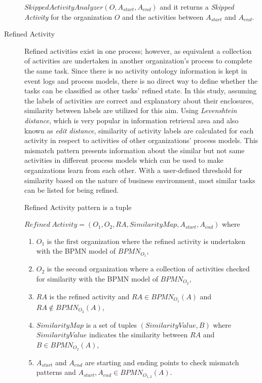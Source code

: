 \begin{description}
\begin{definition}
		$SkippedActivityAnalyzer(O, A_{start}, A_{end})$ and it returns a \textit{Skipped Activity} for the organization $O$ and the activities between $A_{start}$ and $A_{end}$.
		\end{definition}
  \item[Refined Activity] Refined activities exist in one process; however, as equivalent a collection of activities are undertaken in another organization's process to complete the same task. Since there is no activity ontology information is kept in event logs and process models, there is no direct way to define whether the tasks can be classified as other tasks' refined state. In this study, assuming the labels of activities are correct and explanatory about their enclosures, similarity between labels are utilized for this aim. Using \textit{Levenshtein distance}, which is very popular in information retrieval area and also known as \textit{edit distance}, similarity of activity labels are calculated for each activity in respect to activities of other organizations' process models. This mismatch pattern presents information about the similar but not same activities in different process models which can be used to make organizations learn from each other. With a user-defined threshold for similarity based on the nature of business environment, most similar tasks can be listed for being refined.
		\theoremstyle{definition}
		\begin{definition}
		Refined Activity pattern is a tuple 

		${Refined\ Activity} = (O_{1}, O_{2}, RA, SimilarityMap, A_{start}, A_{end}) $ where 
		\begin{enumerate}
		  \item $O_{1}$ is the first organization where the refined activity is undertaken with the BPMN model of $BPMN_{{O}_{1}}$,
		  \item $O_{2}$ is the second organization where a collection of activities checked for similarity with the BPMN model of $BPMN_{{O}_{2}}$,
		  \item $RA$ is the refined activity and $RA \in BPMN_{{O}_{1}}(A)$ and $RA \notin BPMN_{{O}_{2}}(A)$,
		  \item $SimilarityMap$ is a set of tuples $(SimilarityValue, B)$ where $SimilarityValue$ indicates the similarity between $RA$ and $B \in BPMN_{{O}_{2}}(A)$, 
 		  \item $A_{start}$ and $A_{end}$ are starting and ending points to check mismatch patterns and $A_{start}, A_{end} \in BPMN_{{O}_{1,2}}(A)$. 
		\end{enumerate}
		\end{definition}


\end{description}
